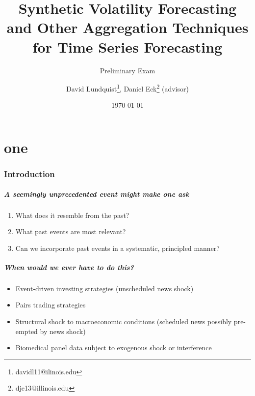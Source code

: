 \documentclass{beamer}
\title{Synthetic Volatility Forecasting and Other Aggregation Techniques for Time Series Forecasting}
\subtitle{Preliminary Exam}
\author{David Lundquist\thanks{davidl11@ilinois.edu}, Daniel Eck\thanks{dje13@illinois.edu} (advisor)}
\date{\today}
\theoremstyle{definition}
\begin{document}
\part{one}
\begin{frame}
\titlepage
\end{frame}

\section{Introduction}

\begin{frame}
\frametitle{A seemingly unprecedented event might make one ask}
\begin{enumerate}
    \item What does it resemble from the past?
    \item What past events are most relevant?
    \item Can we incorporate past events in a systematic, principled manner?
\end{enumerate}
\end{frame}

\begin{frame}
    \frametitle{When would we ever have to do this?}

    \begin{itemize}
        \item Event-driven investing strategies (unscheduled news shock)
        \item Pairs trading strategies
        \item Structural shock to macroeconomic conditions (scheduled news possibly pre-empted by news shock)
        \item Biomedical panel data subject to exogenous shock or interference
    \end{itemize}
\end{frame}
\end{document}
